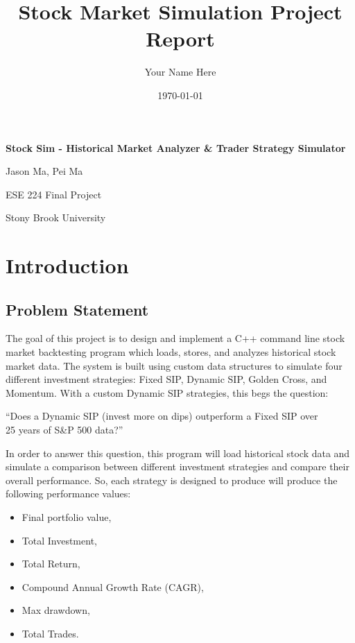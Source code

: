 \documentclass[12pt]{article}
\title{Stock Market Simulation Project Report}
\author{Your Name Here}
\date{\today}
\begin{document}
\begin{titlepage}
    \centering
    \vspace*{2cm}

    {\LARGE \textbf{Stock Sim - Historical Market Analyzer \& Trader Strategy Simulator}\par}
    \vspace{1.5cm}

    {\Large Jason Ma, Pei Ma\par}
    \vspace{0.5cm}

    {\large ESE 224 Final Project\par}
    \vspace{0.5cm}

    {\large Stony Brook University\par}
    \vspace{2cm}
\end{titlepage}

\tableofcontents
\newpage


\section{Introduction}
\subsection{Problem Statement}
The goal of this project is to design and implement a C++ command line stock market backtesting program 
which loads, stores, and analyzes historical stock market data. 
The system is built using custom data structures to simulate four different investment strategies: 
Fixed SIP, Dynamic SIP, Golden Cross, and Momentum. With a custom Dynamic SIP strategies, 
this begs the question: 
\begin{center}
    “Does a Dynamic SIP (invest more on dips) outperform a Fixed SIP over \\25 years of S\&P 500 data?”
\end{center}

In order to answer this question, this program will load historical stock data and 
simulate a comparison between different investment strategies and compare their 
overall performance. So, each strategy is designed to produce will produce the following performance values:
\begin{itemize}
    \item Final portfolio value,
    \item Total Investment,
    \item Total Return,
    \item Compound Annual Growth Rate (CAGR),
    \item Max drawdown,
    \item Total Trades.
\end{itemize}
\end{document}
